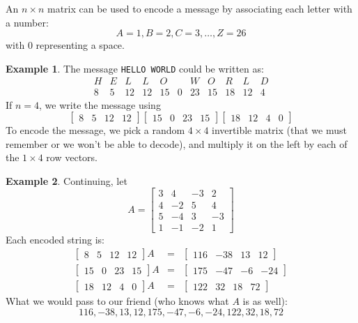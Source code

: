 \documentclass[handout]{beamer}
\newcommand{\fn}{\insertframenumber}
\theoremstyle{definition}
\newtheorem*{exa}{Example}
\begin{document}
\begin{frame}[fragile]{\fn}
	An $n\times n$ matrix can be used to encode a message by associating each letter with a number:
		\[A=1, B=2, C=3,\dots,Z=26\]
	with $0$ representing a space.
	\begin{exa}
		The message \texttt{HELLO WORLD} could be written as:  
			\[\begin{array}{ccccccccccc}
				H&E&L&L&O& &W&O&R&L&D\\
				8&5&12&12&15&0&23&15&18&12&4
			\end{array}\]
		If $n=4$, we write the message using
			\[\begin{bmatrix}8&5&12&12\end{bmatrix}\begin{bmatrix}15&0&23&15\end{bmatrix}
			\begin{bmatrix}18&12&4&0\end{bmatrix}\]
		To encode the message, we pick a random $4\times 4 $ invertible matrix (that we must remember or we won't be able to decode), and multiply it on the left by each of the $1\times 4$ row vectors.
	\end{exa}
\end{frame}
\begin{frame}{\fn}
\begin{exa}
	Continuing, let 
	\[A=\begin{bmatrix}
	3 & 4 & -3 & 2 \\
	4 & -2 & 5 & 4 \\
	5 & -4 & 3 & -3 \\
	1 & -1 & -2 & 1
	\end{bmatrix}\]
	Each encoded string is:\[\begin{array}{rcl}
	\begin{bmatrix}8&5&12&12\end{bmatrix}A&=&\begin{bmatrix}116&-38&13&12\end{bmatrix}\\
	\begin{bmatrix}15&0&23&15\end{bmatrix}A&=&\begin{bmatrix}175&-47&-6&-24\end{bmatrix}\\
	\begin{bmatrix}18&12&4&0\end{bmatrix}A&=&\begin{bmatrix}122&32&18&72\end{bmatrix}
	\end{array}\]
	What we would pass to our friend (who knows what $A$ is as well):
	\[116, -38, 13, 12, 175, -47, -6, -24, 122, 32, 18, 72\]
\end{exa}
\end{frame}
\end{document}
